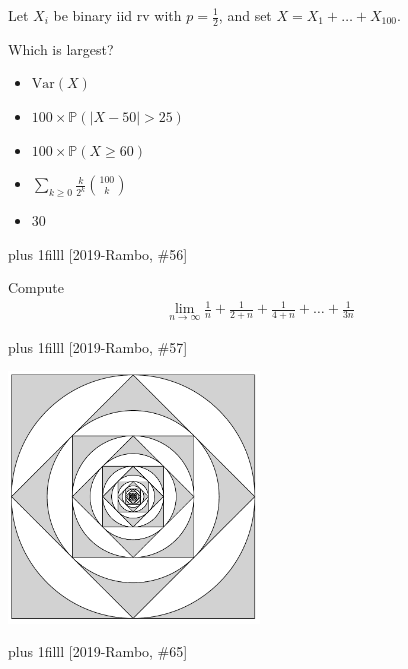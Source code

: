 \documentclass[onepage, 12pt]{beamer}
\def\Bottom#1{\vskip 0pt plus 1filll #1}
\begin{document}
\begin{frame}[t]{}{}
	Let $X_i$ be binary iid rv with $p = \tfrac12$,
	and set $X = X_1 + \ldots + X_{100}$.
	
	Which is largest?
	
	\begin{itemize}
	\item $\text{Var}(X)$
	\item $100 \times \mathbb{P}(|X - 50| > 25)$
	\item $100 \times \mathbb{P}(X \geq 60)$
	\item $\sum_{k \geq 0} \frac{k}{2^k} {100 \choose k}$
	\item $30$
	\end{itemize}

	\Bottom{%
		[2019-Rambo, \#56]
	}
\end{frame}


\begin{frame}[t]{}{}
	Compute
	\begin{align*}
		\lim_{n \to \infty}
		\frac{1}{n}
		+
		\frac{1}{2 + n}
		+
		\frac{1}{4 + n}
		+
		\ldots
		+
		\frac{1}{3 n}
	\end{align*}
    
	\Bottom{%
		[2019-Rambo, \#57]
	}
\end{frame}


\begin{frame}[t]{}{}
	\begin{center}
		\includegraphics[width=0.5\textwidth]{pattern}
	\end{center}
    
	\Bottom{%
		[2019-Rambo, \#65]
	}
\end{frame}
\end{document}
